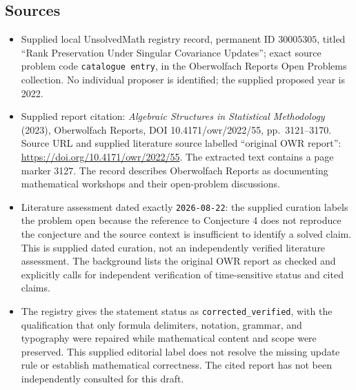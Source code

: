 \documentclass[11pt]{article}
\begin{document}
\subsection{Sources}
\begin{itemize}
\item Supplied local UnsolvedMath registry record, permanent ID \(30005305\), titled ``Rank Preservation Under Singular Covariance Updates''; exact source problem code \texttt{catalogue entry}, in the Oberwolfach Reports Open Problems collection. No individual proposer is identified; the supplied proposed year is 2022.
\item Supplied report citation: \emph{Algebraic Structures in Statistical Methodology} (2023), Oberwolfach Reports, DOI 10.4171/owr/2022/55, pp.\ 3121--3170. Source URL and supplied literature source labelled ``original OWR report'': \url{https://doi.org/10.4171/owr/2022/55}. The extracted text contains a page marker 3127. The record describes Oberwolfach Reports as documenting mathematical workshops and their open-problem discussions.
\item Literature assessment dated exactly \texttt{2026-08-22}: the supplied curation labels the problem open because the reference to Conjecture 4 does not reproduce the conjecture and the source context is insufficient to identify a solved claim. This is supplied dated curation, not an independently verified literature assessment. The background lists the original OWR report as checked and explicitly calls for independent verification of time-sensitive status and cited claims.
\item The registry gives the statement status as \texttt{corrected\_verified}, with the qualification that only formula delimiters, notation, grammar, and typography were repaired while mathematical content and scope were preserved. This supplied editorial label does not resolve the missing update rule or establish mathematical correctness. The cited report has not been independently consulted for this draft.
\end{itemize}
\end{document}
